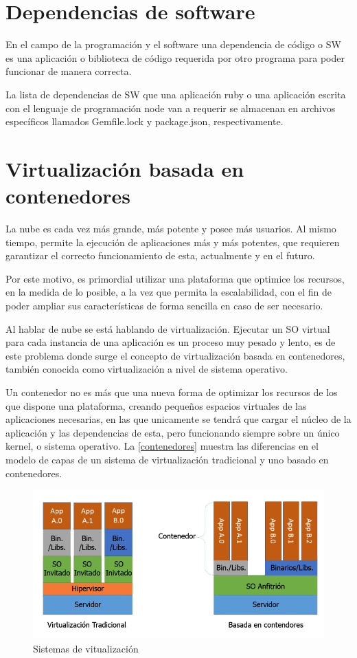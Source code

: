 \section{Dependencias de software}\label{dependencias}

En el campo de la programación y el software una dependencia de código o \gls{SW} es una aplicación o biblioteca de código requerida por otro programa para poder funcionar de manera correcta\cite{wiki2017}.

La lista de dependencias de \gls{SW} que una aplicación ruby o una aplicación escrita con el lenguaje de programación node van a requerir se almacenan en archivos específicos llamados Gemfile.lock y package.json, respectivamente. 

\section{Virtualización basada en contenedores}

La nube es cada vez más grande, más potente y posee más usuarios. Al mismo tiempo, permite la ejecución de aplicaciones más y más potentes, que requieren garantizar el correcto funcionamiento de esta, actualmente y en el futuro.

Por este motivo, es primordial utilizar una plataforma que optimice los recursos, en la medida de lo posible, a la vez que permita la escalabilidad, con el fin de poder ampliar sus características de forma sencilla en caso de ser necesario.

Al hablar de nube se está hablando de virtualización. Ejecutar un \gls{SO} virtual para cada instancia de una aplicación es un proceso muy pesado y lento, es de este problema donde surge el concepto de virtualización basada en contenedores, también conocida como virtualización a nivel de sistema operativo.

Un contenedor no es más que una nueva forma de optimizar los recursos de los que dispone una plataforma, creando pequeños espacios virtuales de las aplicaciones necesarias, en las que unicamente se tendrá que cargar el núcleo de la aplicación y las dependencias de esta, pero funcionando siempre sobre un único kernel, o sistema operativo\cite{velazco2016}. La \autoref{contenedores} muestra las diferencias en el modelo de capas de un sistema de virtualización tradicional y uno basado en contenedores.

\begin{figure}[htbp]
	\centering
	\includegraphics[width=0.8\linewidth]
	{tecnica/figuras/Contenedores.png}
	\caption{Sistemas de vitualización}
	\label{contenedores}
\end{figure}

\endinput